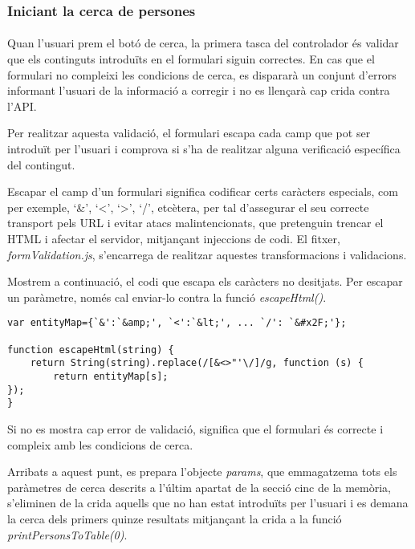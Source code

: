 \subsubsection{Iniciant la cerca de persones}

\paragraph{}
Quan l'usuari prem el botó de cerca, la primera tasca del controlador és validar que els continguts introduïts en el formulari siguin correctes. En cas que el formulari no compleixi les condicions de cerca, es dispararà un conjunt d'errors informant l'usuari de la informació a corregir i no es llençarà cap crida contra l'API.

Per realitzar aquesta validació, el formulari escapa cada camp que pot ser introduït per l'usuari i comprova si s'ha de realitzar alguna verificació específica del contingut.

Escapar el camp d'un formulari significa codificar certs caràcters especials, com per exemple, `\&', `<', `>', `/', etcètera, per tal d'assegurar el seu correcte transport pels URL i evitar atacs malintencionats, que pretenguin trencar el HTML i afectar el servidor, mitjançant injeccions de codi. El fitxer, \emph{formValidation.js}, s'encarrega de realitzar aquestes transformacions i validacions.

Mostrem a continuació, el codi que escapa els caràcters no desitjats. Per escapar un paràmetre, només cal enviar-lo contra la funció \emph{escapeHtml()}.

\begin{lstlisting}[style=rawOwn,caption={Funcio \emph{escapeHtml()} i la variable \emph{entityMap}}]
var entityMap={`&':`&amp;', `<':`&lt;', ... `/': `&#x2F;'};

function escapeHtml(string) {
    return String(string).replace(/[&<>"'\/]/g, function (s) {
        return entityMap[s];
});
}
\end{lstlisting}

Si no es mostra cap error de validació, significa que el formulari és correcte i compleix amb les condicions de cerca.

Arribats a aquest punt, es prepara l'objecte \emph{params}, que emmagatzema tots els paràmetres de cerca descrits a l'últim apartat de la secció cinc de la memòria, s'eliminen de la crida aquells que no han estat introduïts per l'usuari i es demana la cerca dels primers quinze resultats mitjançant la crida a la funció \emph{print\-Persons\-To\-Table(0)}.
